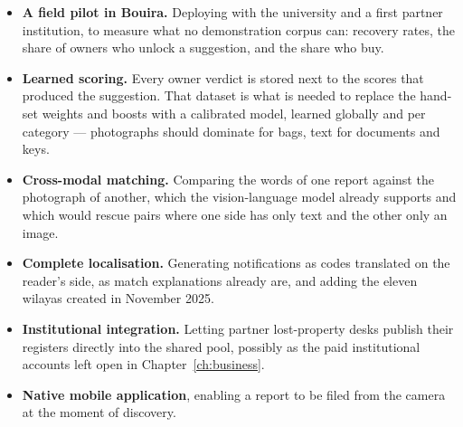 \begin{itemize}[leftmargin=1.4em,itemsep=4pt]
  \item \textbf{A field pilot in Bouira.} Deploying with the university and a
        first partner institution, to measure what no demonstration corpus can:
        recovery rates, the share of owners who unlock a suggestion, and the
        share who buy.

  \item \textbf{Learned scoring.} Every owner verdict is stored next to the
        scores that produced the suggestion. That dataset is what is needed to
        replace the hand-set weights and boosts with a calibrated model, learned
        globally and per category --- photographs should dominate for bags,
        text for documents and keys.

  \item \textbf{Cross-modal matching.} Comparing the words of one report against
        the photograph of another, which the vision-language model already
        supports and which would rescue pairs where one side has only text and
        the other only an image.

  \item \textbf{Complete localisation.} Generating notifications as codes
        translated on the reader's side, as match explanations already are, and
        adding the eleven wilayas created in November 2025.

  \item \textbf{Institutional integration.} Letting partner lost-property desks
        publish their registers directly into the shared pool, possibly as the
        paid institutional accounts left open in Chapter~\ref{ch:business}.

  \item \textbf{Native mobile application}, enabling a report to be filed from
        the camera at the moment of discovery.
\end{itemize}
